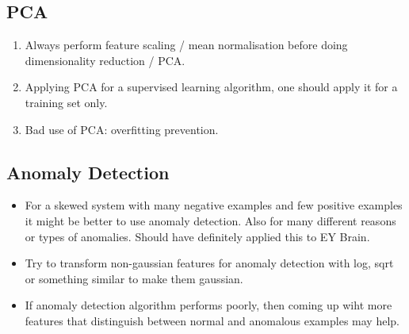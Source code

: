 \documentclass[a4paper,11pt]{article}
\begin{document}
\subsection{PCA}
\begin{enumerate}
\item Always perform feature scaling / mean normalisation before doing dimensionality reduction / PCA.
\item Applying PCA for a supervised learning algorithm, one should apply it for a training set only.
\item Bad use of PCA: overfitting prevention.
\end{enumerate}
\subsection{Anomaly Detection}
\begin{itemize}
\item For a skewed system with many negative examples and few positive examples it might be better to use anomaly detection. Also for many different reasons or types of anomalies. Should have definitely applied this to EY Brain.
\item Try to transform non-gaussian features for anomaly detection with log, sqrt or something similar to make them gaussian.
\item If anomaly detection algorithm performs poorly, then coming up wiht more features that distinguish between normal and anomalous examples may help.
\end{itemize}
\end{document}
